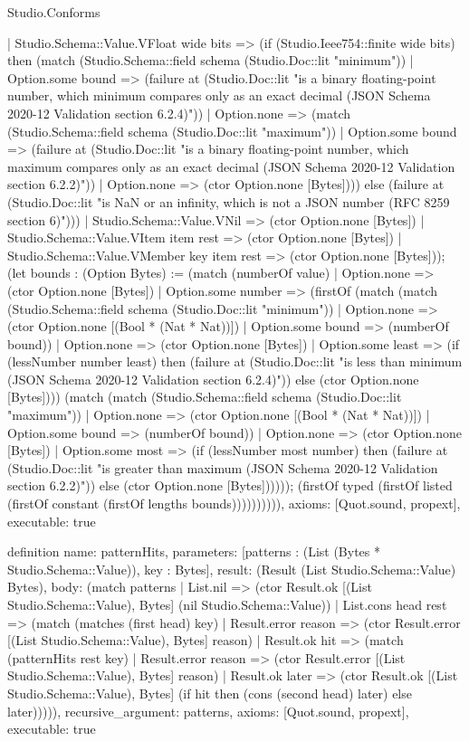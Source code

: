 \begin{lexlean}{Studio.Conforms}
\begin{semanticmodule}
{    | Studio.Schema::Value.VFloat wide bits => (if (Studio.Ieee754::finite wide bits) then (match (Studio.Schema::field schema (Studio.Doc::lit "minimum"))
      | Option.some bound => (failure at (Studio.Doc::lit "is a binary floating-point number, which minimum compares only as an exact decimal (JSON Schema 2020-12 Validation section 6.2.4)"))
      | Option.none => (match (Studio.Schema::field schema (Studio.Doc::lit "maximum"))
        | Option.some bound => (failure at (Studio.Doc::lit "is a binary floating-point number, which maximum compares only as an exact decimal (JSON Schema 2020-12 Validation section 6.2.2)"))
        | Option.none => (ctor Option.none [Bytes]))) else (failure at (Studio.Doc::lit "is NaN or an infinity, which is not a JSON number (RFC 8259 section 6)")))
    | Studio.Schema::Value.VNil => (ctor Option.none [Bytes])
    | Studio.Schema::Value.VItem item rest => (ctor Option.none [Bytes])
    | Studio.Schema::Value.VMember key item rest => (ctor Option.none [Bytes])); (let bounds : (Option Bytes) := (match (numberOf value)
    | Option.none => (ctor Option.none [Bytes])
    | Option.some number => (firstOf (match (match (Studio.Schema::field schema (Studio.Doc::lit "minimum"))
      | Option.none => (ctor Option.none [(Bool * (Nat * Nat))])
      | Option.some bound => (numberOf bound))
      | Option.none => (ctor Option.none [Bytes])
      | Option.some least => (if (lessNumber number least) then (failure at (Studio.Doc::lit "is less than minimum (JSON Schema 2020-12 Validation section 6.2.4)")) else (ctor Option.none [Bytes]))) (match (match (Studio.Schema::field schema (Studio.Doc::lit "maximum"))
      | Option.none => (ctor Option.none [(Bool * (Nat * Nat))])
      | Option.some bound => (numberOf bound))
      | Option.none => (ctor Option.none [Bytes])
      | Option.some most => (if (lessNumber most number) then (failure at (Studio.Doc::lit "is greater than maximum (JSON Schema 2020-12 Validation section 6.2.2)")) else (ctor Option.none [Bytes]))))); (firstOf typed (firstOf listed (firstOf constant (firstOf lengths bounds)))))))))),
  axioms: [Quot.sound, propext],
  executable: true
}

definition{
  name: patternHits,
  parameters: [patterns : (List (Bytes * Studio.Schema::Value)), key : Bytes],
  result: (Result (List Studio.Schema::Value) Bytes),
  body: (match patterns
    | List.nil => (ctor Result.ok [(List Studio.Schema::Value), Bytes] (nil Studio.Schema::Value))
    | List.cons head rest => (match (matches (first head) key)
      | Result.error reason => (ctor Result.error [(List Studio.Schema::Value), Bytes] reason)
      | Result.ok hit => (match (patternHits rest key)
        | Result.error reason => (ctor Result.error [(List Studio.Schema::Value), Bytes] reason)
        | Result.ok later => (ctor Result.ok [(List Studio.Schema::Value), Bytes] (if hit then (cons (second head) later) else later))))),
  recursive_argument: patterns,
  axioms: [Quot.sound, propext],
  executable: true
}


\end{semanticmodule}
\end{lexlean}
